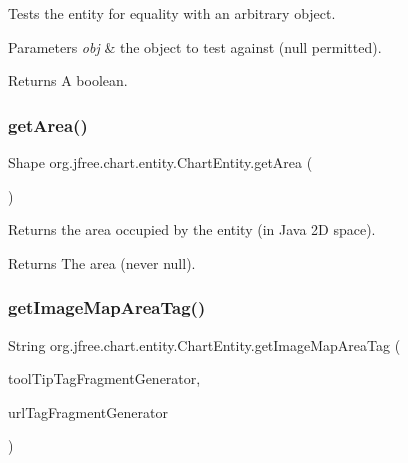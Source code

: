 Tests the entity for equality with an arbitrary object.


\begin{DoxyParams}{Parameters}
{\em obj} & the object to test against ({\ttfamily null} permitted).\\
\hline
\end{DoxyParams}
\begin{DoxyReturn}{Returns}
A boolean. 
\end{DoxyReturn}
\mbox{\label{classorg_1_1jfree_1_1chart_1_1entity_1_1_chart_entity_a2b0e5a6a8a9aceabdb45a21c54cf45fe}} 
\subsubsection{\texorpdfstring{get\+Area()}{getArea()}}
{\footnotesize\ttfamily Shape org.\+jfree.\+chart.\+entity.\+Chart\+Entity.\+get\+Area (\begin{DoxyParamCaption}{ }\end{DoxyParamCaption})}

Returns the area occupied by the entity (in Java 2D space).

\begin{DoxyReturn}{Returns}
The area (never {\ttfamily null}). 
\end{DoxyReturn}
\mbox{\label{classorg_1_1jfree_1_1chart_1_1entity_1_1_chart_entity_a3472768e270818c4ff5ba5acc7677a80}} 
\subsubsection{\texorpdfstring{get\+Image\+Map\+Area\+Tag()}{getImageMapAreaTag()}}
{\footnotesize\ttfamily String org.\+jfree.\+chart.\+entity.\+Chart\+Entity.\+get\+Image\+Map\+Area\+Tag (\begin{DoxyParamCaption}\item[{\mbox{\hyperlink{interfaceorg_1_1jfree_1_1chart_1_1imagemap_1_1_tool_tip_tag_fragment_generator}{Tool\+Tip\+Tag\+Fragment\+Generator}}}]{tool\+Tip\+Tag\+Fragment\+Generator,  }\item[{\mbox{\hyperlink{interfaceorg_1_1jfree_1_1chart_1_1imagemap_1_1_u_r_l_tag_fragment_generator}{U\+R\+L\+Tag\+Fragment\+Generator}}}]{url\+Tag\+Fragment\+Generator }\end{DoxyParamCaption})}

